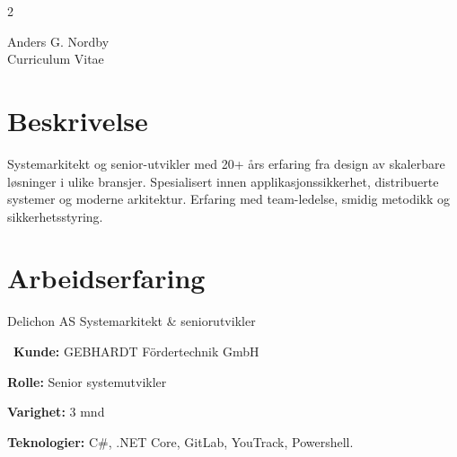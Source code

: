 \documentclass[10pt]{article} %
\begin{document}
\begin{paracol}{2} %


\parbox[top][0.12\textheight][c]{\linewidth}{ %
	\vspace{-0.04\textheight} %
	\centering %
	{\sffamily\Huge Anders G. Nordby}\\\medskip %
	{\Huge\color{headings}\cvtextfont Curriculum Vitae}
}


\section{Beskrivelse}

Systemarkitekt og senior-utvikler med 20+ års erfaring fra design av skalerbare løsninger i ulike bransjer. Spesialisert innen applikasjonssikkerhet, distribuerte systemer og moderne arkitektur. Erfaring med team-ledelse, smidig metodikk og sikkerhetsstyring.


\section{Arbeidserfaring} 

{}
{Delichon AS} 
{Systemarkitekt \& seniorutvikler} 
{\
\textbf{Kunde:} GEBHARDT Fördertechnik GmbH 

\textbf{Rolle:} Senior systemutvikler

\textbf{Varighet:} 3 mnd

\textbf{Teknologier:} C\#, .NET Core, GitLab, YouTrack, Powershell.

\textbf{}

}
\end{paracol}
\end{document}
